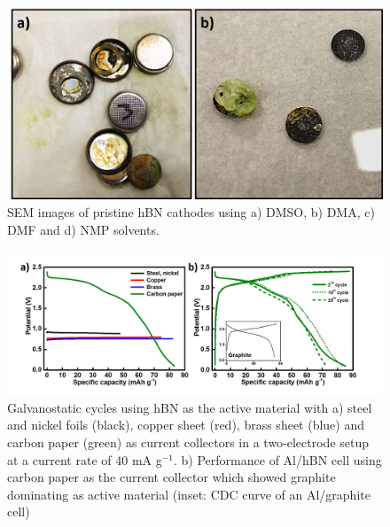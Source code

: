 \begin{figure}[tbh!]
\centering
\includegraphics[width=\textwidth]{Figures/chap7fig/steeleffect}
\caption{SEM images of pristine hBN cathodes using a) DMSO, b) DMA, c) DMF and d) NMP solvents.}
\label{Figures/chap7fig:steeleffect}
\end{figure}
\begin{figure}[tbh!]
\centering
\includegraphics[width=\textwidth]{Figures/chap7fig/hBNCCCDC}
\caption{Galvanostatic cycles using hBN as the active material with a) steel and nickel foils (black), copper sheet (red), brass sheet (blue) and carbon paper (green) as current collectors in a two-electrode setup at a current rate of 40 mA g$^{-1}$. b) Performance of Al/hBN cell using carbon paper as the current collector which showed graphite dominating as active material (inset: CDC curve of an Al/graphite cell) }
\label{Figures/chap7fig:hBNCCCDC}
\end{figure}
